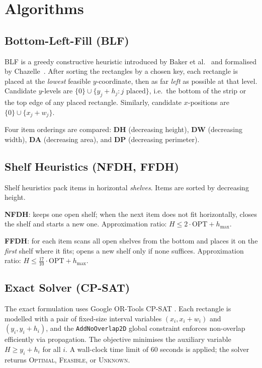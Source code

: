 \documentclass[11pt,a4paper]{article}
\begin{document}
\section{Algorithms}

\subsection{Bottom-Left-Fill (BLF)}

BLF is a greedy constructive heuristic introduced by Baker et al.~\cite{Baker1980}
and formalised by Chazelle~\cite{Chazelle1983}.
After sorting the rectangles by a chosen key, each rectangle is placed at
the \emph{lowest} feasible $y$-coordinate, then as far \emph{left} as
possible at that level.
Candidate $y$-levels are $\{0\} \cup \{y_j + h_j : j \text{ placed}\}$, i.e.\
the bottom of the strip or the top edge of any placed rectangle.
Similarly, candidate $x$-positions are $\{0\} \cup \{x_j + w_j\}$.

Four item orderings are compared:
\textbf{DH} (decreasing height), \textbf{DW} (decreasing width),
\textbf{DA} (decreasing area), and \textbf{DP} (decreasing perimeter).

\subsection{Shelf Heuristics (NFDH, FFDH)}

Shelf heuristics \cite{Coffman1980} pack items in horizontal \emph{shelves}.
Items are sorted by decreasing height.

\textbf{NFDH}: keeps one open shelf; when the next item does not fit horizontally,
closes the shelf and starts a new one.
Approximation ratio: $H \le 2 \cdot \mathrm{OPT} + h_{\max}$.

\textbf{FFDH}: for each item scans all open shelves from the bottom and
places it on the \emph{first} shelf where it fits; opens a new shelf only if
none suffices.
Approximation ratio: $H \le \tfrac{17}{10} \cdot \mathrm{OPT} + h_{\max}$.

\subsection{Exact Solver (CP-SAT)}

The exact formulation uses Google OR-Tools CP-SAT \cite{ORTools}.
Each rectangle is modelled with a pair of fixed-size interval variables
$(x_i, x_i + w_i)$ and $(y_i, y_i + h_i)$, and the \texttt{AddNoOverlap2D}
global constraint enforces non-overlap efficiently via propagation.
The objective minimises the auxiliary variable $H \ge y_i + h_i$ for all $i$.
A wall-clock time limit of 60 seconds is applied; the solver returns
\textsc{Optimal}, \textsc{Feasible}, or \textsc{Unknown}.
\end{document}
